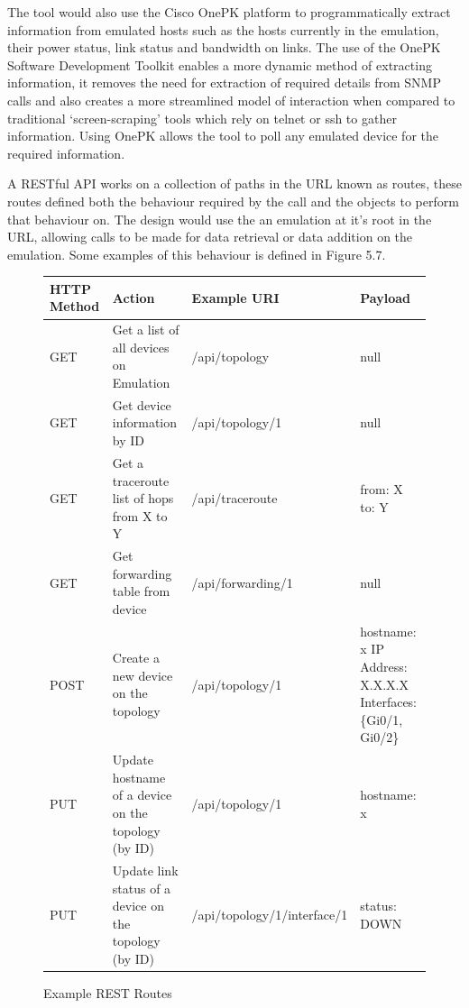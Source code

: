 \documentclass[11pt]{report}
\begin{document}
The tool would also use the Cisco OnePK \citep{OnePK} platform to programmatically extract information from emulated hosts such as the hosts currently in the emulation, their power status, link status and bandwidth on links. The use of the OnePK Software Development Toolkit enables a more dynamic method of extracting information, it removes the need for extraction of required details from SNMP calls and also creates a more streamlined model of interaction when compared to traditional `screen-scraping' tools which rely on telnet or ssh to gather information. Using OnePK allows the tool to poll any emulated device for the required information.

A RESTful API works on a collection of paths in the URL known as routes, these routes defined both the behaviour required by the call and the objects to perform that behaviour on. The design would use the an emulation at it's root in the URL, allowing calls to be made for data retrieval or data addition on the emulation. Some examples of this behaviour is defined in Figure 5.7.

\FloatBarrier
\begin{figure}[h!]
	\caption{Example REST Routes}
	\centering
	\begin{tabular}{|p{1.5cm}|p{4cm}|p{5cm}|p{3.5cm}|}
		\hline \textbf{HTTP Method} & \textbf{Action} & \textbf{Example URI} & \textbf{Payload} \\ 
		\hline GET & Get a list of all devices on Emulation & /api/topology & null \\ 
		\hline GET & Get device information by ID & /api/topology/1 & null \\ 
		\hline GET & Get a traceroute list of hops from X to Y & /api/traceroute & from: X 
		\newline
		to: Y \\ 
		\hline GET & Get forwarding table from device & /api/forwarding/1 & null  \\ 
		\hline POST & Create a new device on the topology & /api/topology/1 & hostname: x 
		\newline
		IP Address: X.X.X.X 
		\newline
		Interfaces: \{Gi0/1, Gi0/2\} \\ 
		\hline PUT & Update hostname of a  device on the topology (by ID) & /api/topology/1 & hostname: x \\ 
		\hline PUT & Update link status of a  device on the topology (by ID) & /api/topology/1/interface/1 & status: DOWN  \\ 
		\hline
	\end{tabular}
\end{figure}
\FloatBarrier
 
\end{document}
